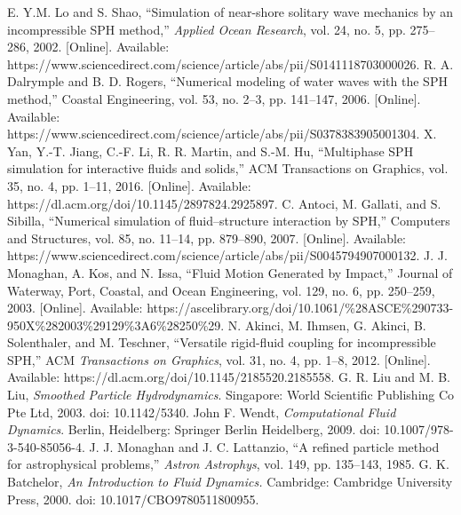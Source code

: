 \documentclass{article}
\begin{document}
\begin{thebibliography}{1.7}
	 \color{cyan}E. Y.M. Lo and S. Shao, “Simulation of near-shore solitary wave mechanics by an incompressible SPH method,” \textit{Applied Ocean Research}, vol. 24, no. 5, pp. 275–286, 2002. [Online]. Available: https://www.sciencedirect.com/science/article/abs/pii/S0141118703000026.\color{black}
	 \color{cyan}R. A. Dalrymple and B. D. Rogers, “Numerical modeling of water waves with the SPH method,” Coastal Engineering, vol. 53, no. 2–3, pp. 141–147, 2006. [Online]. Available: https://www.sciencedirect.com/science/article/abs/pii/S0378383905001304.\color{black}
	 \color{cyan}X. Yan, Y.-T. Jiang, C.-F. Li, R. R. Martin, and S.-M. Hu, “Multiphase SPH simulation for interactive fluids and solids,” ACM Transactions on Graphics, vol. 35, no. 4, pp. 1–11, 2016. [Online]. Available: https://dl.acm.org/doi/10.1145/2897824.2925897.\color{black}
	 \color{cyan}C. Antoci, M. Gallati, and S. Sibilla, “Numerical simulation of fluid–structure interaction by SPH,” Computers and Structures, vol. 85, no. 11–14, pp. 879–890, 2007. [Online]. Available: https://www.sciencedirect.com/science/article/abs/pii/S0045794907000132.\color{black}
	 \color{cyan}J. J. Monaghan, A. Kos, and N. Issa, “Fluid Motion Generated by Impact,” Journal of Waterway, Port, Coastal, and Ocean Engineering, vol. 129, no. 6, pp. 250–259, 2003. [Online]. Available: https://ascelibrary.org/doi/10.1061/\%28ASCE\%290733-950X\%282003\%29129\%3A6\%28250\%29.\color{black}
	 \color{cyan}N. Akinci, M. Ihmsen, G. Akinci, B. Solenthaler, and M. Teschner, “Versatile rigid-fluid coupling for incompressible SPH,” ACM \textit{Transactions on Graphics}, vol. 31, no. 4, pp. 1–8, 2012. [Online]. Available: https://dl.acm.org/doi/10.1145/2185520.2185558. \color{black}
	 \color{cyan}G. R. Liu and M. B. Liu, \textit{Smoothed Particle Hydrodynamics}. Singapore: World Scientific Publishing Co Pte Ltd, 2003. doi: 10.1142/5340. \color{black}
	 \color{cyan}John F. Wendt, \textit{Computational Fluid Dynamics}. Berlin, Heidelberg: Springer Berlin Heidelberg, 2009. doi: 10.1007/978-3-540-85056-4.\color{black}
	 \color{cyan}J. J. Monaghan and J. C. Lattanzio, “A refined particle method for astrophysical problems,” \textit{Astron Astrophys}, vol. 149, pp. 135–143, 1985.\color{black}
	\color{cyan}G. K. Batchelor, \textit{An Introduction to Fluid Dynamics.} Cambridge: Cambridge University Press, 2000. doi: 10.1017/CBO9780511800955.\color{black}

\end{thebibliography}
\end{document}
